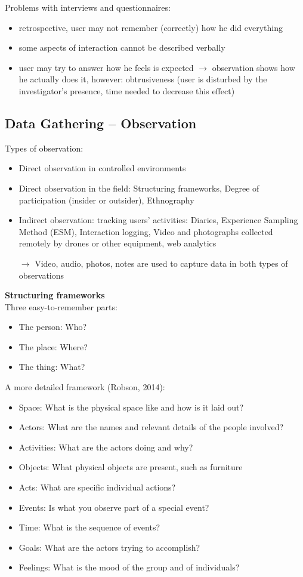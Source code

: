 Problems with interviews and questionnaires:
\begin{itemize}
\item retrospective, user may not remember (correctly) how he did everything
\item some aspects of interaction cannot be described verbally
\item user may try to answer how he feels is expected $\rightarrow$ observation shows how he actually does it, however: obtrusiveness (user is disturbed by the investigator's presence, time needed to decrease this effect)
\end{itemize}
\subsection{Data Gathering -- Observation}
Types of observation:
\begin{itemize}
\item Direct observation in controlled environments
\item Direct observation in the field: Structuring frameworks, Degree of participation (insider or outsider), Ethnography
\item Indirect observation: tracking users’ activities: Diaries, Experience Sampling Method (ESM), Interaction logging, Video and photographs collected remotely by drones or other equipment, web analytics
\item[$\rightarrow$] Video, audio, photos, notes are used to capture data in both types of observations
\end{itemize}
\textbf{Structuring frameworks}\\
Three easy-to-remember parts:
\begin{itemize}
\item The person: Who?
\item The place: Where?
\item The thing: What?
\end{itemize}
A more detailed framework (Robson, 2014):
\begin{itemize}
\item Space: What is the physical space like and how is it laid out?
\item Actors: What are the names and relevant details of the people involved?
\item Activities: What are the actors doing and why?
\item Objects: What physical objects are present, such as furniture
\item Acts: What are specific individual actions?
\item Events: Is what you observe part of a special event?
\item Time: What is the sequence of events?
\item Goals: What are the actors trying to accomplish?
\item Feelings: What is the mood of the group and of individuals?
\end{itemize}
